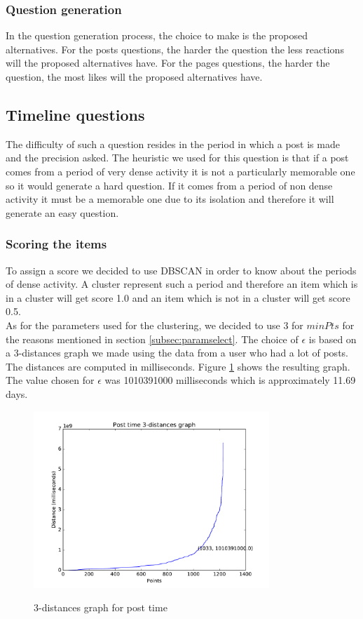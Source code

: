 \subsubsection{Question generation}
In the question generation process, the choice to make is the proposed alternatives. For the posts questions, the harder the question the less reactions will the proposed alternatives have. For the pages questions, the harder the question, the most likes will the proposed alternatives have.
\subsection{Timeline questions}
The difficulty of such a question resides in the period in which a post is made and the precision asked. The heuristic we used for this question is that if a post comes from a period of very dense activity it is not a particularly memorable one so it would generate a hard question. If it comes from a period of non dense activity it must be a memorable one due to its isolation and therefore it will generate an easy question.
\subsubsection{Scoring the items}
To assign a score we decided to use DBSCAN in order to know about the periods of dense activity. A cluster represent such a period and therefore an item which is in a cluster will get score 1.0 and an item which is not in a cluster will get score 0.5.\\
As for the parameters used for the clustering, we decided to use 3 for $minPts$ for the reasons mentioned in section \ref{subsec:paramselect}. The choice of $\epsilon$ is based on a 3-distances graph we made using the data from a user who had a lot of posts. The distances are computed in milliseconds. Figure \ref{fig:postTime} shows the resulting graph. The value chosen for $\epsilon$ was 1010391000 milliseconds which is approximately 11.69 days.
\begin{figure}
\centering
{\includegraphics[width=3.5in]{images/post_time_knn.pdf}}
\caption{3-distances graph for post time}
\label{fig:postTime}
\end{figure}
